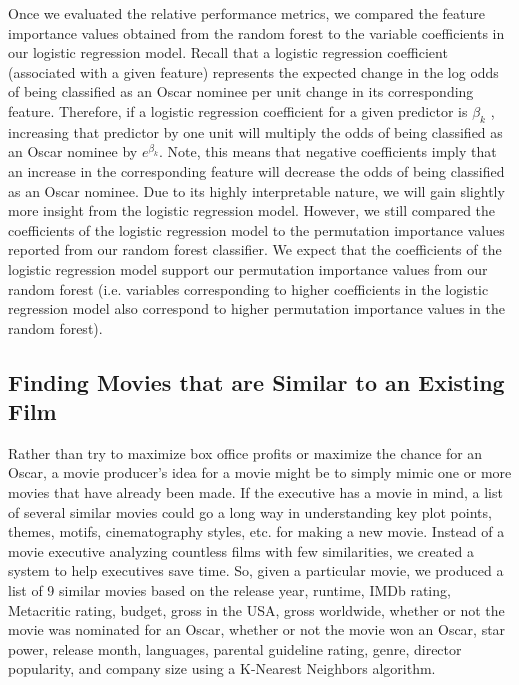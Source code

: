 \documentclass[10pt]{article}
\begin{document}
Once we evaluated the relative performance metrics, we compared the feature importance values obtained from the random forest to the variable coefficients in our logistic regression model. Recall that a logistic regression coefficient (associated with a given feature) represents the expected change in the log odds of being classified as an Oscar nominee per unit change in its corresponding feature. Therefore, if a logistic regression coefficient for a given predictor is $\beta_k$ , increasing that predictor by one unit will multiply the odds of being classified as an Oscar nominee by $e^{\beta_k}$. Note, this means that negative coefficients imply that an increase in the corresponding feature will decrease the odds of being classified as an Oscar nominee. Due to its highly interpretable nature, we will gain slightly more insight from the logistic regression model. However, we still compared the coefficients of the logistic regression model to the permutation importance values reported from our random forest classifier. We expect that the coefficients of the logistic regression model support our permutation importance values from our random forest (i.e. variables corresponding to higher coefficients in the logistic regression model also correspond to higher permutation importance values in the random forest).

\subsection{Finding Movies that are Similar to an Existing Film}

Rather than try to maximize box office profits or maximize the chance for an Oscar, a movie producer’s idea for a movie might be to simply mimic one or more movies that have already been made. If the executive has a movie in mind, a list of several similar movies could go a long way in understanding key plot points, themes, motifs, cinematography styles, etc. for making a new movie. Instead of a movie executive analyzing countless films with few similarities, we created a system to help executives save time. So, given a particular movie, we produced a list of 9 similar movies based on the release year, runtime, IMDb rating, Metacritic rating, budget, gross in the USA, gross worldwide, whether or not the movie was nominated for an Oscar, whether or not the movie won an Oscar, star power, release month, languages, parental guideline rating, genre, director popularity, and company size using a K-Nearest Neighbors algorithm.
\end{document}

